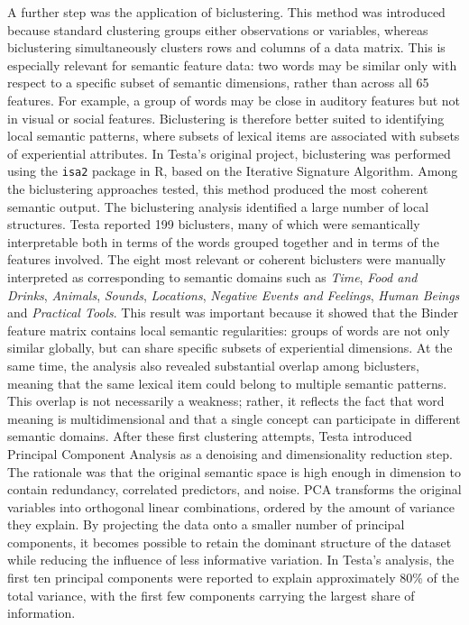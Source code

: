 \documentclass{ipgpmaster}
\begin{document}
A further step was the application of biclustering. This method was introduced because standard clustering groups either observations or variables, whereas biclustering simultaneously clusters rows and columns of a data matrix. This is especially relevant for semantic feature data: two words may be similar only with respect to a specific subset of semantic dimensions, rather than across all 65 features. For example, a group of words may be close in auditory features but not in visual or social features. Biclustering is therefore better suited to identifying local semantic patterns, where subsets of lexical items are associated with subsets of experiential attributes. In Testa's original project, biclustering was performed using the \texttt{isa2} package in R, based on the Iterative Signature Algorithm. Among the biclustering approaches tested, this method produced the most coherent semantic output.
The biclustering analysis identified a large number of local structures. Testa reported 199 biclusters, many of which were semantically interpretable both in terms of the words grouped together and in terms of the features involved. The eight most relevant or coherent biclusters were manually interpreted as corresponding to semantic domains such as \emph{Time}, \emph{Food and Drinks}, \emph{Animals}, \emph{Sounds}, \emph{Locations}, \emph{Negative Events and Feelings}, \emph{Human Beings} and \emph{Practical Tools}. This result was important because it showed that the Binder feature matrix contains local semantic regularities: groups of words are not only similar globally, but can share specific subsets of experiential dimensions. At the same time, the analysis also revealed substantial overlap among biclusters, meaning that the same lexical item could belong to multiple semantic patterns. This overlap is not necessarily a weakness; rather, it reflects the fact that word meaning is multidimensional and that a single concept can participate in different semantic domains.
After these first clustering attempts, Testa introduced Principal Component Analysis as a denoising and dimensionality reduction step. The rationale was that the original semantic space is high enough in dimension to contain redundancy, correlated predictors, and noise. PCA transforms the original variables into orthogonal linear combinations, ordered by the amount of variance they explain. By projecting the data onto a smaller number of principal components, it becomes possible to retain the dominant structure of the dataset while reducing the influence of less informative variation. In Testa's analysis, the first ten principal components were reported to explain approximately 80\% of the total variance, with the first few components carrying the largest share of information.
\end{document}
